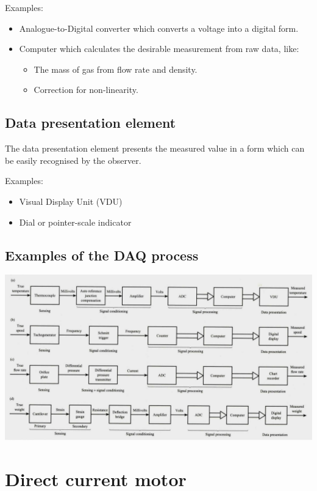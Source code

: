 \documentclass[11pt]{article}
\begin{document}
Examples:
\begin{itemize}
\item Analogue-to-Digital converter which converts a voltage into a digital form.
\item Computer which calculates the desirable measurement from raw data, like:
\begin{itemize}
\item The mass of gas from flow rate and density.
\item Correction for non-linearity.
\end{itemize}
\end{itemize}

\subsection{Data presentation element}
\label{sec:org88d17e7}
The data presentation element presents the measured value in a form which can be easily recognised by the observer.

Examples:
\begin{itemize}
\item Visual Display Unit (VDU)
\item Dial or pointer-scale indicator
\end{itemize}

\subsection{Examples of the DAQ process}
\label{sec:org31b4d62}
\begin{center}
\includegraphics[width=.9\linewidth]{./images/data-acquisition-process-examples.png}
\end{center}

 \newpage

\section{Direct current motor}
\label{sec:orgef97d62}
\end{document}
